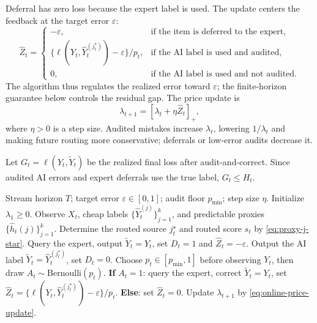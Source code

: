 \documentclass[11pt]{article}
\newcommand{\hatY}{\widehat Y}
\newcommand{\tildeY}{\widetilde Y}
\newcommand{\hath}{\widehat h}
\newcommand{\eps}{\varepsilon}
\begin{document}
Deferral has zero loss because the expert label is used. The update centers the
feedback at the target error $\eps$:
\[
    \widehat Z_t
    =
    \begin{cases}
        -\eps,
        & \text{if the item is deferred to the expert},\\[2mm]
        \{\ell(Y_t,\hatY_t^{(j_t^\star)})-\eps\}/p_t,
        & \text{if the AI label is used and audited},\\[2mm]
        0,
        & \text{if the AI label is used and not audited}.
    \end{cases}
\]
The algorithm thus regulates the realized error toward $\eps$; the
finite-horizon guarantee below controls the residual gap.
The price update is
\begin{equation}
    \lambda_{t+1}=[\lambda_t+\eta\widehat Z_t]_+,
    \label{eq:online-price-update}
\end{equation}
where $\eta>0$ is a step size.
Audited mistakes increase \(\lambda_t\), lowering \(1/\lambda_t\) and making
future routing more conservative; deferrals or low-error audits decrease it.

Let $G_t=\ell(Y_t,\tildeY_t)$ be the realized final loss after
audit-and-correct. Since audited AI errors and expert deferrals use the true
label,
\(
    G_t\le H_t.
\)

\begin{algorithm}[ht]
\caption{Audited online PAC labeling}
\label{alg:online-audited}
\small
\begin{algorithmic}[1]
\Require Stream horizon $T$; target error $\eps\in[0,1]$; audit floor $p_{\min}$; step size $\eta$.
\State Initialize $\lambda_1\ge0$.
    \State Observe $X_t$, cheap labels $\{\hatY_t^{(j)}\}_{j=1}^k$, and predictable proxies $\{\hath_t(j)\}_{j=1}^k$.
    \State Determine the routed source $j_t^\star$ and routed score $s_t$ by \eqref{eq:proxy-j-star}.
        \State Query the expert, output $\tildeY_t=Y_t$, set $D_t=1$ and $\widehat Z_t=-\eps$.
    \Else
        \State Output the AI label $\tildeY_t=\hatY_t^{(j_t^\star)}$, set $D_t=0$.
        \State Choose $p_t\in[p_{\min},1]$ before observing $Y_t$, then draw $A_t\sim\mathrm{Bernoulli}(p_t)$.
        \State \textbf{If} $A_t=1$: query the expert, correct $\tildeY_t=Y_t$, set $\widehat Z_t=\{\ell(Y_t,\hatY_t^{(j_t^\star)})-\eps\}/p_t$.
        \State \textbf{Else}: set $\widehat Z_t=0$.
    \EndIf
    \State Update $\lambda_{t+1}$ by \eqref{eq:online-price-update}.
\EndFor
\end{algorithmic}
\end{algorithm}
\end{document}
